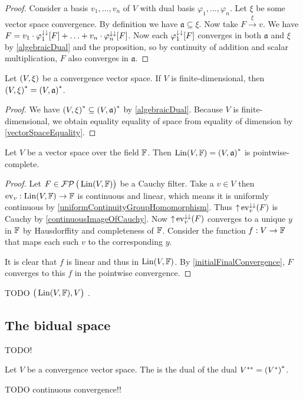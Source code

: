 \begin{proof}
Consider a basis $v_1, \ldots, v_n$ of $V$ with dual basis $\varphi_1, \ldots, \varphi_n$. Let $\xi$ be some vector space convergence. By definition we have $\mathfrak{a} \subseteq \xi$. Now take $F \overset{\xi}{\longrightarrow} v$. We have $F = v_1\cdot \varphi_1^{\downarrow\downarrow}[F] + \ldots + v_n\cdot \varphi_n^{\downarrow\downarrow}[F]$. Now each $\varphi_1^{\downarrow\downarrow}[F]$ converges in both $\mathfrak{a}$ and $\xi$ by \ref{algebraicDual} and the proposition, so by continuity of addition and scalar multiplication, $F$ also converges in $\mathfrak{a}$. 
\end{proof}
\begin{corollary}
Let $\sSet{V,\xi}$ be a convergence vector space. If $V$ is finite-dimensional, then $\sSet{V,\xi}^* = \sSet{V,\mathfrak{a}}^*$.
\end{corollary}
\begin{proof}
We have $\sSet{V,\xi}^* \subseteq \sSet{V,\mathfrak{a}}^*$ by \ref{algebraicDual}. Because $V$ is finite-dimensional, we obtain equality equality of space from equality of dimension by \ref{vectorSpaceEquality}.
\end{proof}

\begin{proposition} \label{algebraicDualComplete}
Let $V$ be a vector space over the field $\mathbb{F}$. Then $\Lin(V,\F) = \dual{\sSet{V, \mathfrak{a}}}$ is pointwise-complete.
\end{proposition}
\begin{proof}
Let $F\in\operatorname{\mathcal{FP}}\big(\operatorname{Lin}(V,\mathbb{F})\big)$ be a Cauchy filter. Take a $v\in V$ then $\operatorname{ev}_v: \operatorname{Lin}(V,\mathbb{F})\to \mathbb{F}$ is continuous and linear, which means it is uniformly continuous by \ref{uniformContinuityGroupHomomorphism}. Thus $\operatorname{\uparrow}\operatorname{ev}_v^{\downarrow\downarrow}(F)$ is Cauchy by \ref{continuousImageOfCauchy}. Now $\operatorname{\uparrow}\operatorname{ev}_v^{\downarrow\downarrow}(F)$ converges to a unique $y$ in $\mathbb{F}$ by Hausdorffity and completeness of $\mathbb{F}$. Consider the function $f: V\to \mathbb{F}$ that maps each such $v$ to the corresponding $y$.

It is clear that $f$ is linear and thus in $\operatorname{Lin}(V,\mathbb{F})$. By \ref{initialFinalConvergence}, $F$ converges to this $f$ in the pointwise convergence.
\end{proof}
TODO $\big(\operatorname{Lin}(V,\mathbb{F}),V\big)$ .

\subsection{The bidual space}
TODO!
\begin{definition}
Let $V$ be a convergence vector space. The  is the dual of the dual ${V}^{**} = {({V}^*)}^*$.
\end{definition}
TODO continuous convergence!!

